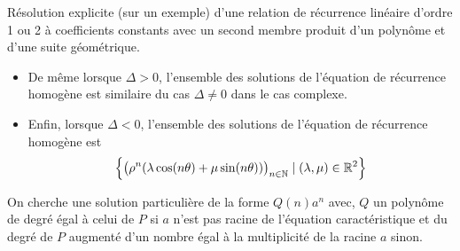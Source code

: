 \documentclass{article}
\begin{document}
\begin{question_kholle}{Résolution explicite (sur un exemple) d’une
		relation de récurrence linéaire d’ordre 1 ou 2 à coefficients
		constants avec un second membre produit d’un polynôme et d’une
		suite géométrique.}
\begin{itemize}
\begin{itemize}
\begin{itemize}
				                  du cas complexe.
				            \item De même lorsque $\Delta>0$, l’ensemble des
				                  solutions de l’équation de récurrence homogène est
				                  similaire du cas $\Delta\neq 0$ dans le cas complexe.
				            \item Enfin, lorsque $\Delta<0$, l’ensemble des solutions
				                  de l’équation de récurrence homogène est
				                  \[
					                  \Bigl\{\bigl(\rho^{n}(\lambda\cos(n \theta)+\mu\sin(n
					                  \theta))\bigr)_{n\in\mathbb N} \mid (\lambda, \mu)\in\mathbb R^{2}\Bigr\}
				                  \]
			            \end{itemize}
		      \end{itemize}
		      On cherche une solution particulière de la forme $Q(n)a^{n}$
		      avec, $Q$ un polynôme de degré égal à celui de $P$ si $a$ n’est
		      pas racine de l’équation caractéristique et du degré de $P$
		      augmenté d’un nombre égal à la multiplicité de la racine $a$ sinon.
	\end{itemize}

\end{question_kholle}
\end{document}
